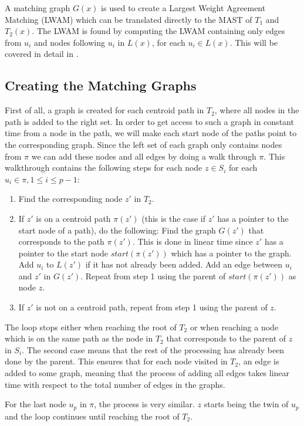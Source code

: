 A matching graph $G(x)$ is used to create a Largest Weight Agreement Matching (LWAM) which can be translated directly to the MAST of $T_1$ and $T_2(x)$. The LWAM is found by computing the LWAM containing only edges from $u_i$ and nodes following $u_i$ in $L(x)$, for each $u_i \in L(x)$. This will be covered in detail in .

\subsection{Creating the Matching Graphs}
First of all, a graph is created for each centroid path in $T_2$, where all nodes in the path is added to the right set. In order to get access to such a graph in constant time from a node in the path, we will make each start node of the paths point to the corresponding graph.
Since the left set of each graph only contains nodes from $\pi$ we can add these nodes and all edges by doing a walk through $\pi$. This walkthrough contains the following steps for each node $z \in S_i$ for each $u_i \in \pi, 1 \le i \le p-1$:

\begin{enumerate}
	\item Find the corresponding node $z'$ in $T_2$.
	\item If $z'$ is on a centroid path $\pi(z')$ (this is the case if $z'$ has a pointer to the start node of a path), do the following:
	\subitem Find the graph $G(z')$ that corresponds to the path $\pi(z')$. This is done in linear time since $z'$ has a pointer to the start node $start(\pi(z'))$ which has a pointer to the graph.
	\subitem Add $u_i$ to $L(z')$ if it has not already been added.
	\subitem Add an edge between $u_i$ and $z'$ in $G(z')$.
	\subitem Repeat from step 1 using the parent of $start(\pi(z'))$ as node $z$.
	\item If $z'$ is not on a centroid path, repeat from step 1 using the parent of $z$.
\end{enumerate}
The loop stops either when reaching the root of $T_2$ or when reaching a node which is on the same path as the node in $T_2$ that corresponds to the parent of $z$ in $S_i$. The second case means that the rest of the processing has already been done by the parent. This ensures that for each node visited in $T_2$, an edge is added to some graph, meaning that the process of adding all edges takes linear time with respect to the total number of edges in the graphs.

For the last node $u_p$ in $\pi$, the process is very similar. $z$ starts being the twin of $u_p$ and the loop continues until reaching the root of $T_2$.\\

